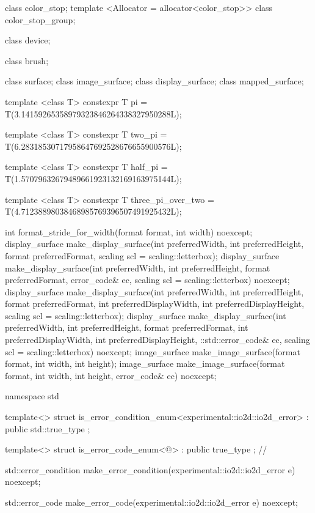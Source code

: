 \begin{codeblock}
{{{{  class color_stop;
  template <Allocator = allocator<color_stop>>
  class color_stop_group;
  
  class device;

  class brush;
  
  class surface;
  class image_surface;
  class display_surface;
  class mapped_surface;
  
  template <class T>
  constexpr T pi = T(3.14159265358979323846264338327950288L);
  
  template <class T>
  constexpr T two_pi = T(6.28318530717958647692528676655900576L);
  
  template <class T>
  constexpr T half_pi = T(1.57079632679489661923132169163975144L);
  
  template <class T>
  constexpr T three_pi_over_two = T(4.71238898038468985769396507491925432L);
  
  int format_stride_for_width(format format, int width) noexcept;
  display_surface make_display_surface(int preferredWidth,
    int preferredHeight, format preferredFormat,
    scaling scl = scaling::letterbox);
  display_surface make_display_surface(int preferredWidth,
    int preferredHeight, format preferredFormat, error_code& ec,
    scaling scl = scaling::letterbox) noexcept;
  display_surface make_display_surface(int preferredWidth,
    int preferredHeight, format preferredFormat, int preferredDisplayWidth, 
    int preferredDisplayHeight, scaling scl = scaling::letterbox);
  display_surface make_display_surface(int preferredWidth,
    int preferredHeight, format preferredFormat, int preferredDisplayWidth, 
    int preferredDisplayHeight, ::std::error_code& ec,
    scaling scl = scaling::letterbox) noexcept;
  image_surface make_image_surface(format format, int width, int height);
  image_surface make_image_surface(format format, int width, int height, 
    error_code& ec) noexcept;
} } } }

namespace std {
  template<>
  struct is_error_condition_enum<experimental::io2d::io2d_error>
    : public std::true_type{ };

  template<>
  struct is_error_code_enum<@\impdef@>
    : public true_type{ }; // \expos

  std::error_condition make_error_condition(experimental::io2d::io2d_error e) 
    noexcept;

  std::error_code make_error_code(experimental::io2d::io2d_error e) noexcept;
}

\end{codeblock}
%
